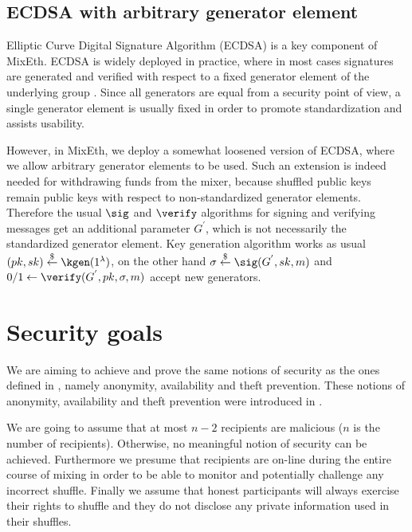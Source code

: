 \documentclass[a4paper]{article}
\theoremstyle{definition}
\begin{document}
\subsection{ECDSA with arbitrary generator element}
Elliptic Curve Digital Signature Algorithm (ECDSA) is a key component of MixEth. ECDSA is widely deployed in practice, where in most cases signatures are generated and verified with respect to a fixed generator element of the underlying group \cite{fersch2016provable}. Since all generators are equal from a security point of view, a single generator element is usually fixed in order to promote standardization and assists usability.

However, in MixEth, we deploy a somewhat loosened version of ECDSA, where we allow arbitrary generator elements to be used. Such an extension is indeed needed for withdrawing funds from the mixer, because shuffled public keys remain public keys with respect to non-standardized generator elements. Therefore the usual $\sig$ and $\verify$ algorithms for signing and verifying messages get an additional parameter $G^{'}$, which is not necessarily the standardized generator element. Key generation algorithm works as usual $(pk,sk)\stackrel{\$}{\leftarrow}\kgen(1^{\lambda})$, on the other hand $\sigma\stackrel{\$}{\leftarrow}\sig(G^{'},sk,m)$ and  $0/1\leftarrow \verify(G^{'},pk,\sigma, m)$ accept new generators.

\section{Security goals} \label{securitygoals}
We are aiming to achieve and prove the same notions of security as the ones defined in \cite{meiklejohn2018mobius}, namely anonymity, availability and theft prevention. These notions of anonymity, availability and theft prevention were introduced in \cite{meiklejohn2018mobius}.

We are going to assume that at most $n-2$ recipients are malicious ($n$ is the number of recipients). Otherwise, no meaningful notion of security can be achieved. Furthermore we presume that recipients are on-line during the entire course of mixing in order to be able to monitor and potentially challenge any incorrect shuffle. Finally we assume that honest participants will always exercise their rights to shuffle and they do not disclose any private information used in their shuffles.
\end{document}

